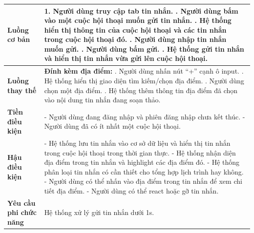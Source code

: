 \begin{longtable}{| p{4cm} | p{\dimexpr\linewidth-4cm-4\tabcolsep} |}
    \textbf{Luồng cơ bản} & 1. Người dùng truy cập tab tin nhắn. \newline
                           2. Người dùng bấm vào một cuộc hội thoại muốn gửi tin nhắn. \newline
                           3. Hệ thống hiển thị thông tin của cuộc hội thoại và các tin nhắn trong cuộc hội thoại đó. \newline
                           4. Người dùng nhập tin nhắn muốn gửi. \newline
                           5. Người dùng bấm gửi. \newline
                           6. Hệ thống gửi tin nhắn và hiển thị tin nhắn vừa gửi lên cuộc hội thoại. \\
    \hline
    \textbf{Luồng thay thế} & \textbf{Đính kèm địa điểm:} \newline
                               1. Người dùng nhấn nút ``+'' cạnh ô input. \newline
                               2. Hệ thống hiển thị giao diện tìm kiếm/chọn địa điểm. \newline
                               3. Người dùng chọn một địa điểm. \newline
                               4. Hệ thống thêm thông tin địa điểm đã chọn vào nội dung tin nhắn đang soạn thảo. \\
    \hline
    \textbf{Tiền điều kiện} & - Người dùng đang đăng nhập và phiên đăng nhập chưa kết thúc. \newline
                           - Người dùng đã có ít nhất một cuộc hội thoại. \\
    \hline
    \textbf{Hậu điều kiện} & - Hệ thống lưu tin nhắn vào cơ sở dữ liệu và hiển thị tin nhắn trong cuộc hội thoại trong thời gian thực. \newline
                           - Hệ thống nhận diện địa điểm trong tin nhắn và highlight các địa điểm đó. \newline
                           - Hệ thống phân loại tin nhắn có cần thiết cho tổng hợp lịch trình hay không. \newline
                           - Người dùng có thể nhấn vào địa điểm trong tin nhắn để xem chi tiết địa điểm. \newline
                           - Người dùng có thể react hoặc gỡ tin nhắn. \\
    \hline
    \textbf{Yêu cầu phi chức năng} & Hệ thống xử lý gửi tin nhắn dưới 1s. \\

\end{longtable}
\vspace{0.8cm}

